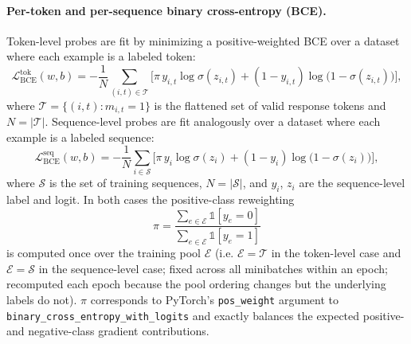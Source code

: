 \documentclass{article} %
\begin{document}
\paragraph{Per-token and per-sequence binary cross-entropy (BCE).}
Token-level probes are
fit by minimizing a positive-weighted BCE over a dataset where each example is a labeled token:
\begin{equation}
\mathcal{L}_{\mathrm{BCE}}^{\mathrm{tok}}(w, b)
= -\frac{1}{N}\sum_{(i,t)\in\mathcal{T}}
  \Big[
    \pi\,y_{i,t}\log\sigma(z_{i,t})
    + (1 - y_{i,t})\log\bigl(1 - \sigma(z_{i,t})\bigr)
  \Big],
\label{eq:bce-loss-probe-tok}
\end{equation}
where $\mathcal{T} = \{(i,t) : m_{i,t} = 1\}$ is the flattened set of
valid response tokens and $N = |\mathcal{T}|$. Sequence-level probes are fit analogously over a dataset where each example is a labeled sequence:
\begin{equation}
\mathcal{L}_{\mathrm{BCE}}^{\mathrm{seq}}(w, b)
= -\frac{1}{N}\sum_{i\in\mathcal{S}}
  \Big[
    \pi\,y_{i}\log\sigma(z_{i})
    + (1 - y_{i})\log\bigl(1 - \sigma(z_{i})\bigr)
  \Big],
\label{eq:bce-loss-probe-seq}
\end{equation}
where $\mathcal{S}$ is the set of training sequences, $N = |\mathcal{S}|$, and $y_i$, $z_i$ are the sequence-level label and logit. In both cases the positive-class
reweighting
\begin{equation}
\pi
= \frac{
    \sum_{e\in\mathcal{E}} \mathbb 1[y_{e} = 0]
  }{
    \sum_{e\in\mathcal{E}} \mathbb 1[y_{e} = 1]
  }
\label{eq:pos-weight}
\end{equation}
is computed once over the training pool $\mathcal{E}$ (i.e. $\mathcal{E}=\mathcal{T}$ in the token-level case and $\mathcal{E}=\mathcal{S}$ in the sequence-level case; fixed across all minibatches
within an epoch; recomputed each epoch because the pool ordering changes
but the underlying labels do not). $\pi$ corresponds to PyTorch's
\texttt{pos\_weight} argument to
\texttt{binary\_cross\_entropy\_with\_logits} and exactly balances the
expected positive- and negative-class gradient contributions.
\end{document}
